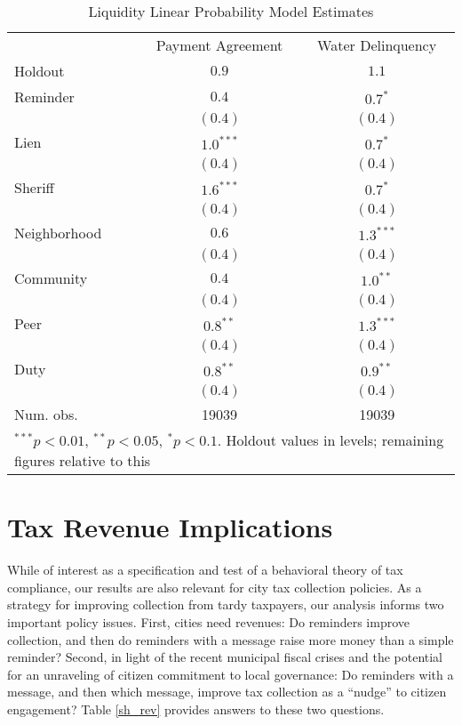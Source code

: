 \documentclass[12pt]{article}
\begin{document}
\begin{table}[htb]
\caption{Liquidity Linear Probability Model Estimates}
\begin{center}
\begin{tabular}{l c c }
\hline
 & Payment Agreement & Water Delinquency \\
Holdout      & $0.9$ & $1.1$ \\
\hline
Reminder     & $0.4$       & $0.7^{*}$   \\
             & $(0.4)$     & $(0.4)$     \\
Lien         & $1.0^{***}$ & $0.7^{*}$   \\
             & $(0.4)$     & $(0.4)$     \\
Sheriff      & $1.6^{***}$ & $0.7^{*}$   \\
             & $(0.4)$     & $(0.4)$     \\
Neighborhood & $0.6$       & $1.3^{***}$ \\
             & $(0.4)$     & $(0.4)$     \\
Community    & $0.4$       & $1.0^{**}$  \\
             & $(0.4)$     & $(0.4)$     \\
Peer         & $0.8^{**}$  & $1.3^{***}$ \\
             & $(0.4)$     & $(0.4)$     \\
Duty         & $0.8^{**}$  & $0.9^{**}$  \\
             & $(0.4)$     & $(0.4)$     \\
\hline
Num. obs.    & 19039       & 19039       \\
\hline
\multicolumn{3}{l}{\scriptsize{$^{***}p<0.01$, $^{**}p<0.05$, $^*p<0.1$. Holdout values in levels; remaining figures relative to this}}
\end{tabular}
\label{waterrelholdout}
\end{center}
\end{table}

\section{Tax Revenue Implications}

While of interest as a specification and test of a behavioral theory
of tax compliance, our results are also relevant for city tax
collection policies.  As a strategy for improving collection from
tardy taxpayers, our analysis informs two important policy issues.
First, cities need revenues: Do reminders improve collection, and then
do reminders with a message raise more money than a simple reminder?
Second, in light of the recent municipal fiscal crises and the
potential for an unraveling of citizen commitment to local governance:
Do reminders with a message, and then which message, improve tax
collection as a ``nudge'' to citizen engagement? Table \ref{sh_rev}
provides answers to these two questions.
\end{document}
